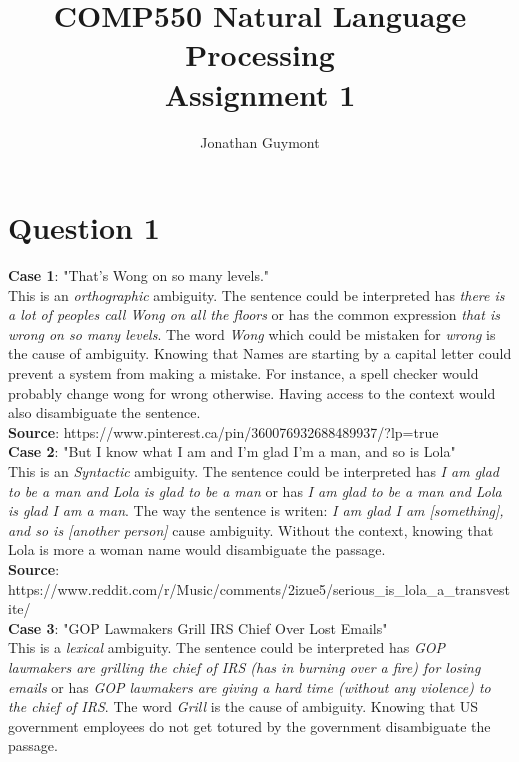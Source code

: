 \documentclass[10pt]{article}
\begin{document}
\title{COMP550 Natural Language Processing\\Assignment 1}
\author{Jonathan Guymont}
\maketitle

\section*{Question 1}
\textbf{Case 1}: "That's Wong on so many levels."\\

This is an \textit{orthographic} ambiguity. The sentence could be interpreted has \textit{there is a lot of peoples call Wong on all the floors} or has the common expression \textit{that is wrong on so many levels}. The word \textit{Wong} which could be mistaken for \textit{wrong} is the cause of ambiguity. Knowing that Names are starting by a capital letter could prevent a system from making a mistake. For instance, a spell checker would probably change wong for wrong otherwise. Having access to the context would also disambiguate the sentence. \\

\textbf{Source}: https://www.pinterest.ca/pin/360076932688489937/?lp=true\\

\textbf{Case 2}: "But I know what I am and I'm glad I'm a man, and so is Lola"\\

This is an \textit{Syntactic} ambiguity. The sentence could be interpreted has \textit{I am glad to be a man and Lola is glad to be a man} or has \textit{I am glad to be a man and Lola is glad I am a man}. The way the sentence is writen: \textit{I am glad I am [something], and so is [another person]} cause ambiguity. Without the context, knowing that Lola is more a woman name would disambiguate the passage.\\

\textbf{Source}: https://www.reddit.com/r/Music/comments/2izue5/serious\_is\_lola\_a\_transvestite/\\

\textbf{Case 3}: "GOP Lawmakers Grill IRS Chief Over Lost Emails"\\

This is a \textit{lexical} ambiguity. The sentence could be interpreted has \textit{GOP lawmakers are grilling the chief of IRS (has in burning over a fire) for losing emails} or has \textit{GOP lawmakers are giving a hard time (without any violence) to the chief of IRS}. The word \textit{Grill} is the cause of ambiguity. Knowing that US government employees do not get totured by the government disambiguate the passage.\\
\end{document}
